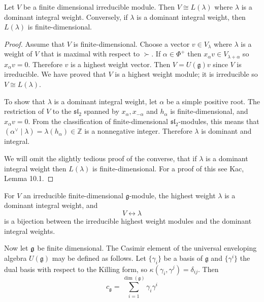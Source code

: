 \documentclass[12pt]{article}
\begin{document}
\begin{theorem}\label{thm:fd-classification}
    Let $V$ be a finite dimensional irreducible module. Then
    $V \cong L(\lambda)$ where $\lambda$ is a dominant integral weight.
    Conversely, if $\lambda$ is a dominant integral weight, then $L(\lambda)$
    is finite-dimensional.
\end{theorem}

\begin{proof}
    Assume that $V$ is finite-dimensional. Choose a vector
    $v \in V_\lambda$ where $\lambda$ is a weight of $V$ that is maximal with
    respect to $\succ$. If $\alpha \in \Phi^+$ then
    $x_\alpha v \in V_{\lambda + \alpha}$ so $x_\alpha v = 0$. Therefore $v$
    is a highest weight vector. Then $V = U(\mathfrak{g})v$ since $V$ is
    irreducible. We have proved that $V$ is a highest weight module; it is
    irreducible so $V \cong L(\lambda)$.

    To show that $\lambda$ is a dominant integral weight, let $\alpha$ be a
    simple positive root. The restriction of $V$ to the $\mathfrak{sl}_2$
    spanned by $x_\alpha, x_{-\alpha}$ and $h_\alpha$ is finite-dimensional,
    and $x_\alpha v = 0$. From the classification of finite-dimensional
    $\mathfrak{sl}_2$-modules, this means that
    $(\alpha^\vee \mid \lambda) = \lambda(h_\alpha) \in \mathbb{Z}$ is a
    nonnegative integer. Therefore $\lambda$ is dominant and integral.

    We will omit the slightly tedious proof of the converse, that if $\lambda$ is a dominant integral weight then $L(\lambda)$ is finite-dimensional. For a proof of this see Kac, Lemma 10.1.
\end{proof}

\begin{corollary}[Weyl]
    For $V$ an irreducible finite-dimensional $\mathfrak{g}$-module, the highest
    weight $\lambda$ is a dominant integral weight, and
    \[
        V \longleftrightarrow \lambda
    \]
    is a bijection between the irreducible highest weight modules and the
    dominant integral weights.
\end{corollary}

Now let $\mathfrak{g}$ be finite dimensional. The Casimir element of the universal enveloping algebra $U(\mathfrak{g})$ may be defined as follows. Let $\{\gamma_i\}$ be a basis of $\mathfrak{g}$ and $\{\gamma^i\}$ the dual basis with respect
to the Killing form, so $\kappa(\gamma_i, \gamma^j) = \delta_{ij}$. Then
\[
    c_{\mathfrak{g}} = \sum_{i=1}^{\dim(\mathfrak{g})} \gamma_i \gamma^i
\]
\end{document}
